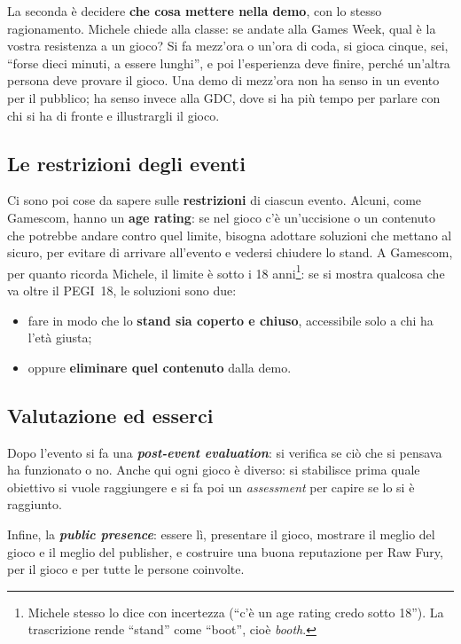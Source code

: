 La seconda è decidere \textbf{che cosa mettere nella demo}, con lo stesso
ragionamento. Michele chiede alla classe: se andate alla Games Week, qual è la
vostra resistenza a un gioco? Si fa mezz'ora o un'ora di coda, si gioca cinque,
sei, ``forse dieci minuti, a essere lunghi'', e poi l'esperienza deve finire,
perché un'altra persona deve provare il gioco. Una demo di mezz'ora non ha
senso in un evento per il pubblico; ha senso invece alla GDC, dove si ha più
tempo per parlare con chi si ha di fronte e illustrargli il gioco.

\subsection{Le restrizioni degli eventi}

Ci sono poi cose da sapere sulle \textbf{restrizioni} di ciascun evento. Alcuni,
come Gamescom, hanno un \textbf{age rating}: se nel gioco c'è un'uccisione o un
contenuto che potrebbe andare contro quel limite, bisogna adottare soluzioni
che mettano al sicuro, per evitare di arrivare all'evento e vedersi chiudere lo
stand. A Gamescom, per quanto ricorda Michele, il limite è sotto i 18
anni\footnote{Michele stesso lo dice con incertezza (``c'è un age rating credo
sotto 18''). La trascrizione rende ``stand'' come ``boot'', cioè
\emph{booth}.}: se si mostra qualcosa che va oltre il PEGI~18, le soluzioni
sono due:
\begin{itemize}
  \item fare in modo che lo \textbf{stand sia coperto e chiuso}, accessibile solo
        a chi ha l'età giusta;
  \item oppure \textbf{eliminare quel contenuto} dalla demo.
\end{itemize}

\subsection{Valutazione ed esserci}

Dopo l'evento si fa una \textbf{\emph{post-event evaluation}}: si verifica se ciò
che si pensava ha funzionato o no. Anche qui ogni gioco è diverso: si stabilisce
prima quale obiettivo si vuole raggiungere e si fa poi un \emph{assessment} per
capire se lo si è raggiunto.

Infine, la \textbf{\emph{public presence}}: essere lì, presentare il gioco,
mostrare il meglio del gioco e il meglio del publisher, e costruire una buona
reputazione per Raw Fury, per il gioco e per tutte le persone coinvolte.

